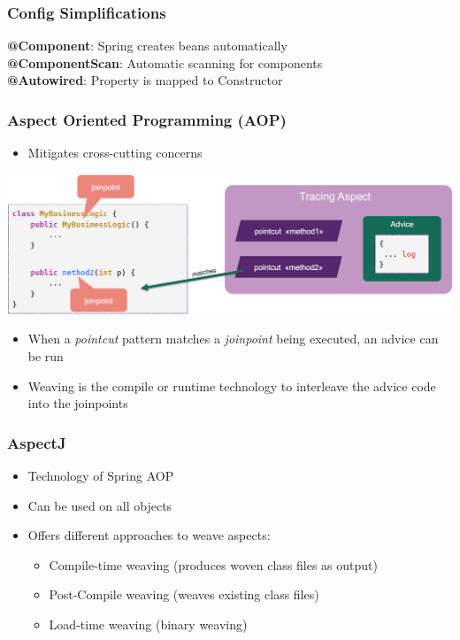 \subsubsection{Config Simplifications}
\textbf{@Component}: Spring creates beans automatically\\ 
\textbf{@ComponentScan}: Automatic scanning for components\\
\textbf{@Autowired}: Property is mapped to Constructor

\subsubsection{Aspect Oriented Programming (AOP)}
\begin{itemize}
    \item Mitigates cross-cutting concerns
\end{itemize}
\includegraphics[width=\linewidth]{./img/aop.png}
\begin{itemize}
    \item When a \textit{pointcut} pattern matches a \textit{joinpoint} being executed, an advice can be run
    \item Weaving is the compile or runtime technology to interleave the advice code into the joinpoints
\end{itemize}

\subsubsection{AspectJ}
\begin{itemize}
    \item Technology of Spring AOP
    \item Can be used on all objects
    \item Offers different approaches to weave aspects:
    \begin{itemize}
        \item Compile-time weaving (produces woven class files as output)
        \item Post-Compile weaving (weaves existing class files)
        \item Load-time weaving (binary weaving)
    \end{itemize}
\end{itemize}